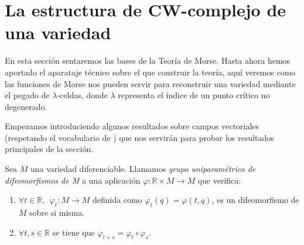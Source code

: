 

\section{La estructura de CW-complejo de una variedad}

En esta sección sentaremos las bases de la Teoría de Morse. Hasta ahora hemos aportado el aparataje técnico sobre el que construir la teoría, aquí veremos como las funciones de Morse nos pueden servir para reconstruir una variedad mediante el pegado de $\lambda$-celdas, donde $\lambda$ representa el índice de un punto crítico no degenerado.

Empezamos introduciendo algunos resultados sobre campos vectoriales (respetando el vocabulario de \cite{milnor1963}) que nos servirán para probar los resultados principales de la sección.

\bigskip
\begin{definition}
    Sea $M$ una variedad diferenciable. Llamamos \textit{grupo uniparamétrico de difeomorfismos de M} a una aplicación $\varphi:\mathbb{R}\times M \to M$ que verifica:
    \begin{enumerate}[label=\roman*)]
        \item $\forall t\in \mathbb{R},~~ \varphi_t:M\to M$ definida como $\varphi_t(q)=\varphi(t,q)$, es un difeomorfismo de $M$ sobre si misma.

        \item $\forall t, s\in\mathbb{R}$ se tiene que $\varphi_{t+s}=\varphi_t\circ \varphi_s$.
    \end{enumerate}
\end{definition}

